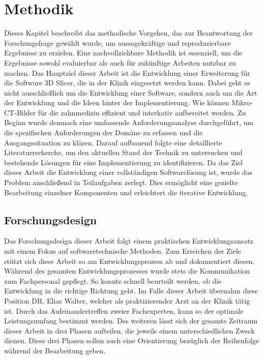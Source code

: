\chapter{Methodik}
\label{chap:methodik} Dieses Kapitel beschreibt das methodische Vorgehen, das
zur Beantwortung der Forschungsfrage gewählt wurde, um aussagekräftige und reproduzierbare
Ergebnisse zu erzielen. Eine nachvollziehbare Methodik ist essenziell, um die Ergebnisse
sowohl evaluierbar als auch für zukünftige Arbeiten nutzbar zu machen. Das
Hauptziel dieser Arbeit ist die Entwicklung einer Erweiterung für die Software
3D Slicer, die in der Klinik eingesetzt werden kann. Dabei geht es nicht
ausschließlich um die Entwicklung einer Software, sondern auch um die Art der Entwicklung
und die Ideen hinter der Implementierung. Wie können Mikro-CT-Bilder für die
zahnmedizin effizient und interkativ aufbereitet werden. Zu Beginn wurde demnach
eine umfassende Anforderungsanalyse durchgeführt, um die spezifischen
Anforderungen der Domäne zu erfassen und die Ausgangssituation zu klären. Darauf
aufbauend folgte eine detaillierte Literaturrecherche, um den aktuellen Stand
der Technik zu untersuchen und bestehende Lösungen für eine Implementierung zu
identifizieren. Da das Ziel dieser Arbeit die Entwicklung einer vollständigen Softwarelösung
ist, wurde das Problem anschließend in Teilaufgaben zerlegt. Dies ermöglicht eine
gezielte Bearbeitung einzelner Komponenten und erleichtert die iterative Entwicklung.

\section{Forschungsdesign}
Das Forschungsdesign dieser Arbeit folgt einem praktischen Entwicklungsansatz mit
einem Fokus auf softwaretechnische Methoden. Zum Erreichen der Ziele stützt sich
diese Arbeit so am Entwicklungsprozess ab und dokumentiert diesen. Während des gesamten
Entwicklungsprozesses wurde stets die Kommunikation zum Fachpersonal gepflegt.
So konnte schnell beurteilt werden, ob die Entwicklung in die richtige Richtung geht.
Im Falle dieser Arbeit übernahm diese Position DR. Elias Walter, welcher als
praktizierender Arzt an der Klinik tätig ist. Durch das Aufeinandertreffen zweier
Fachexperten, kann so der optimale Leistungsumfang bestimmt werden. Des weiteren
lässt sich der gesamte Zeitraum dieser Arbeit in drei Phasen aufteilen, die
jeweils einem unterschiedlichen Zweck dienen. Diese drei Phasen sollen auch eine
Orientierung bezüglich der Reihenfolge während der Bearbeitung geben.
\pagebreak

